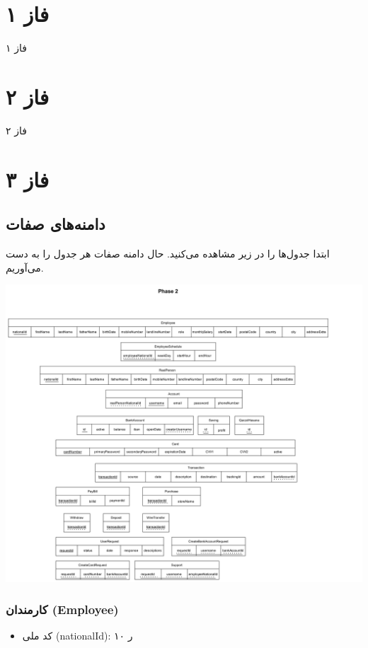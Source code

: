 \documentclass{article}
\begin{document}
\section{فاز ۱}
فاز ۱


\section{فاز ۲}
فاز ۲

\section{فاز ۳}
	\subsection{دامنه‌های صفات‌}
	ابتدا جدول‌ها را در زیر مشاهده می‌کنید.
	حال دامنه صفات هر جدول را به دست می‌آوریم.
	
	
	\includegraphics[width=1.2\textwidth]{Phase 2.png}\\
	
	
	\subsubsection{کارمندان (Employee)}
		\begin{itemize}
			\item کد ملی (nationalId): ۱۰ ر
		\end{itemize}
\end{document}
